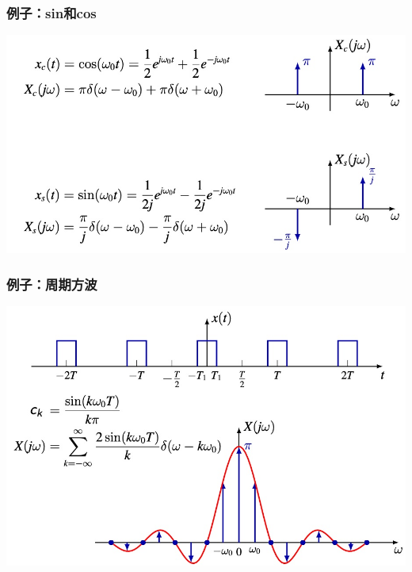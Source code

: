 \documentclass[CJKutf8,xcolor=pdftex,dvipsnames,table]{beamer}
\begin{document}
\begin{CJK*}{UTF8}{song}
  \begin{frame}
    \frametitle{例子：sin和cos}
    \begin{center}
      \includegraphics[scale=.4]{ftsincos}
    \end{center}    
  \end{frame}

  \begin{frame}
    \frametitle{例子：周期方波}
    \begin{center}
      \includegraphics[scale=.35]{ftpsquare}
    \end{center}    
  \end{frame}    
    

\end{CJK*}
\end{document}
